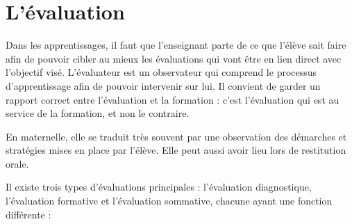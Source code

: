 \section{L'évaluation}

Dans les apprentissages, il faut que l'enseignant parte de ce que l'élève sait faire afin de pouvoir cibler au mieux les évaluations qui vont être en lien direct avec l'objectif visé. L'évaluateur est un observateur qui comprend le processus d'apprentissage afin de pouvoir intervenir sur lui. Il convient de garder un rapport correct entre l'évaluation et la formation : c'est l'évaluation qui est au service de la formation, et non le contraire. \medskip

En maternelle, elle se traduit très souvent par une observation des démarches et stratégies mises en place par l'élève. Elle peut aussi avoir lieu lors de restitution orale. \medskip

Il existe trois types d'évaluations principales : l'évaluation diagnostique, l'évaluation formative et l'évaluation sommative, chacune ayant une fonction différente : \medskip

